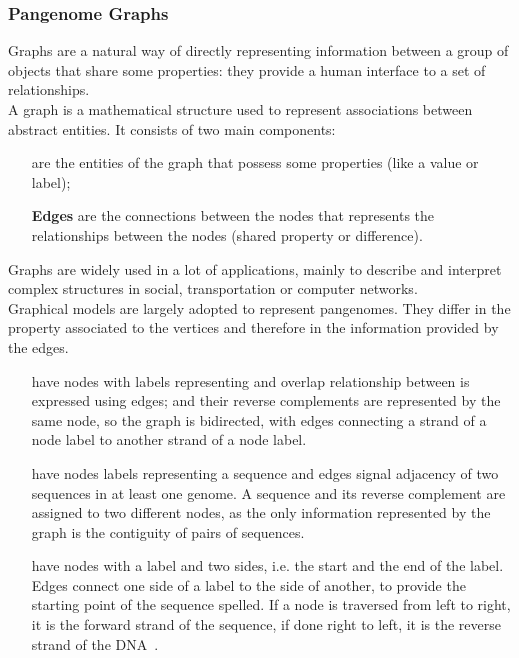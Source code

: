 \subsubsection{Pangenome Graphs}
Graphs are a natural way of directly representing information between a group of objects that share some properties: they provide a human interface to a set of relationships. \\
A graph is a mathematical structure used to represent associations between abstract entities. It consists of two main components:
\begin{itemize}[leftmargin=1.8cm]
	\item[\smash{\stackunder{\textbf{Nodes}}{\textbf{(vertices)}}}] are the entities of the graph that possess some properties (like a value or label);
	\item[\textbf{Edges}] are the connections between the nodes that represents the relationships between the nodes (shared property or difference).
\end{itemize}
Graphs are widely used in a lot of applications, mainly to describe and interpret complex structures in social, transportation or computer networks.\\
Graphical models are largely adopted to represent pangenomes. They differ in the property associated to the vertices and therefore in the information provided by the edges.
\begin{itemize}[leftmargin=1.8cm]
	\item[{\smash{\stackunder{\textbf{De Bruijn}}{\textbf{graphs}}}}] have nodes with labels representing \kmers and overlap relationship between \kmers is expressed using edges; \kmers and their reverse complements are represented by the same node, so the graph is bidirected, with edges connecting a strand of a node label to another strand of a node label.
	\item[{\smash{\stackunder{\textbf{Directed genome}}{\textbf{graphs}}}}] have nodes labels representing a sequence and edges signal adjacency of two sequences in at least one genome. A sequence and its reverse complement are assigned to two different nodes, as the only information represented by the graph is the contiguity of pairs of sequences.
	\item[{\smash{\stackunder{\textbf{Bidirected genome}}{\textbf{graphs}}}}] have nodes with a label and two sides, i.e. the start and the end of the label. Edges connect one side of a label to the side of another, to provide the starting point of the sequence spelled. If a node is traversed from left to right, it is the forward strand of the sequence, if done right to left, it is the reverse strand of the DNA~\cite{odgi}.
\end{itemize}
